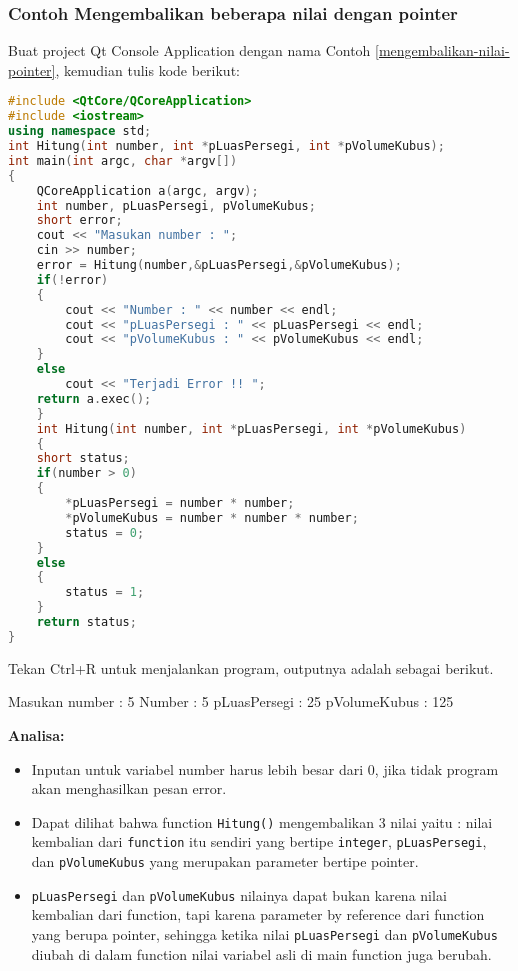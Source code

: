 \subsubsection*{Contoh  Mengembalikan beberapa nilai dengan pointer}

Buat project Qt Console Application dengan nama Contoh \ref{mengembalikan-nilai-pointer}, kemudian
tulis kode berikut:

\begin{lstlisting}[language=c++, caption=Mengembalikan beberapa nilai dengan pointer, label=mengembalikan-nilai-pointer]
#include <QtCore/QCoreApplication>
#include <iostream>
using namespace std;
int Hitung(int number, int *pLuasPersegi, int *pVolumeKubus);
int main(int argc, char *argv[])
{
    QCoreApplication a(argc, argv);
    int number, pLuasPersegi, pVolumeKubus;
    short error;
    cout << "Masukan number : ";
    cin >> number;
    error = Hitung(number,&pLuasPersegi,&pVolumeKubus);
    if(!error)
    {
        cout << "Number : " << number << endl;
        cout << "pLuasPersegi : " << pLuasPersegi << endl;
        cout << "pVolumeKubus : " << pVolumeKubus << endl;
    }
    else
        cout << "Terjadi Error !! ";
    return a.exec();
    }
    int Hitung(int number, int *pLuasPersegi, int *pVolumeKubus)
    {
    short status;
    if(number > 0)
    {
        *pLuasPersegi = number * number;
        *pVolumeKubus = number * number * number;
        status = 0;
    }
    else
    {
        status = 1;
    }
    return status;
}
\end{lstlisting}

Tekan Ctrl+R untuk menjalankan program, outputnya adalah sebagai
berikut.

\begin{lcverbatim}
Masukan number : 5
Number : 5
pLuasPersegi : 25
pVolumeKubus : 125
\end{lcverbatim}

\textbf{Analisa:}

\begin{itemize}

\item
  Inputan untuk variabel number harus lebih besar dari 0, jika tidak
  program akan menghasilkan pesan error.
\item
  Dapat dilihat bahwa function \texttt{Hitung()} mengembalikan 3 nilai
  yaitu : nilai kembalian dari \texttt{function} itu sendiri yang
  bertipe \texttt{integer}, \texttt{pLuasPersegi}, dan
  \texttt{pVolumeKubus} yang merupakan parameter bertipe pointer.
\item
  \texttt{pLuasPersegi} dan \texttt{pVolumeKubus} nilainya dapat bukan
  karena nilai kembalian dari function, tapi karena parameter by
  reference dari function yang berupa pointer, sehingga ketika nilai
  \texttt{pLuasPersegi} dan \texttt{pVolumeKubus} diubah di dalam
  function nilai variabel asli di main function juga berubah.
\end{itemize}


